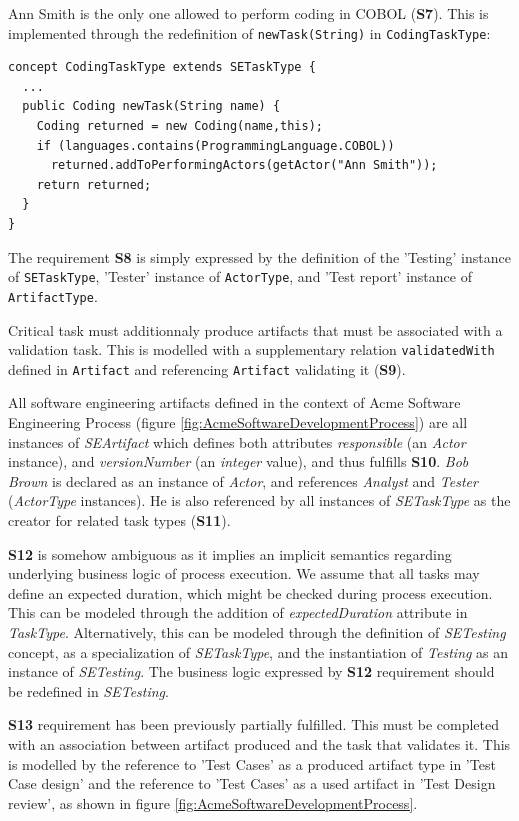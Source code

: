 \textsf{Ann Smith} is the only one allowed to perform coding in COBOL (\textbf{S7}). This is implemented through the redefinition of \texttt{newTask(String)} in \texttt{CodingTaskType}:

\begin{lstlisting}
concept CodingTaskType extends SETaskType {
  ...
  public Coding newTask(String name) {
    Coding returned = new Coding(name,this); 
    if (languages.contains(ProgrammingLanguage.COBOL))
      returned.addToPerformingActors(getActor("Ann Smith"));
    return returned;
  }
}    
\end{lstlisting}

The requirement \textbf{S8} is simply expressed by the definition of the \textsf{'Testing'} instance of \texttt{SETaskType}, \textsf{'Tester'} instance of \texttt{ActorType}, and \textsf{'Test report'} instance of \texttt{ArtifactType}.

Critical task must additionnaly produce artifacts that must be associated with a validation task. This is modelled with a supplementary relation \texttt{validatedWith} defined in \texttt{Artifact} and referencing \texttt{Artifact} validating it (\textbf{S9}).

All software engineering artifacts defined in the context of Acme Software Engineering Process (figure \ref{fig:AcmeSoftwareDevelopmentProcess}) are all instances of \textit{SEArtifact} which defines both attributes \textit{responsible} (an \textit{Actor} instance), and \textit{versionNumber} (an \textit{integer} value), and thus fulfills \textbf{S10}. \textit{Bob Brown} is declared as an instance of \textit{Actor}, and references \textit{Analyst} and \textit{Tester} (\textit{ActorType} instances). He is also referenced by all instances of \textit{SETaskType} as the creator for related task types (\textbf{S11}).

\textbf{S12} is somehow ambiguous as it implies an implicit semantics regarding underlying business logic of process execution. We assume that all tasks may define an expected duration, which might be checked during process execution. This can be modeled through the addition of \textit{expectedDuration} attribute in \textit{TaskType}. Alternatively, this can be modeled through the definition of \textit{SETesting} concept, as a specialization of \textit{SETaskType}, and the instantiation of \textit{Testing} as an instance of \textit{SETesting}. The business logic expressed by \textbf{S12} requirement should be redefined in \textit{SETesting}.

\textbf{S13} requirement has been previously partially fulfilled. This must be completed with an association between artifact produced and the task that validates it. This is modelled by the reference to 'Test Cases' as a produced artifact type in 'Test Case design' and the reference to 'Test Cases' as a used artifact in 'Test Design review', as shown in figure \ref{fig:AcmeSoftwareDevelopmentProcess}.

